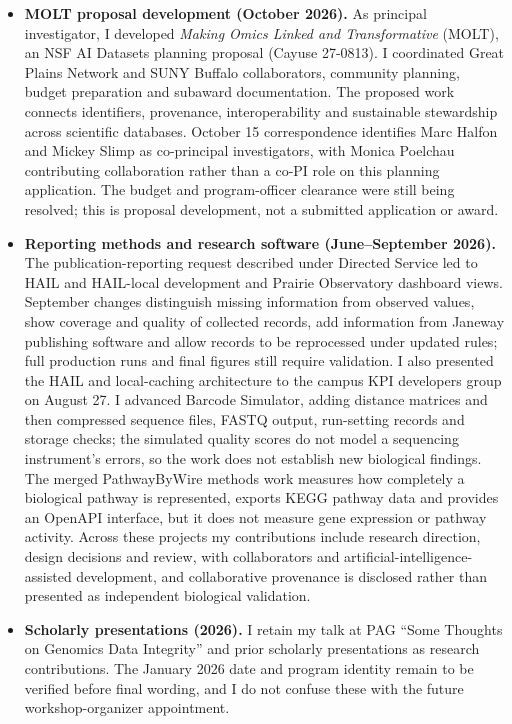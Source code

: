 \begin{itemize}
\item \textbf{MOLT proposal development (October 2026).}\label{update-molt} As principal investigator, I developed \textit{Making Omics Linked and Transformative} (MOLT), an NSF AI Datasets planning proposal (Cayuse 27-0813). I coordinated Great Plains Network and SUNY Buffalo collaborators, community planning, budget preparation and subaward documentation. The proposed work connects identifiers, provenance, interoperability and sustainable stewardship across scientific databases. October 15 correspondence identifies Marc Halfon and Mickey Slimp as co-principal investigators, with Monica Poelchau contributing collaboration rather than a co-PI role on this planning application. The budget and program-officer clearance were still being resolved; this is proposal development, not a submitted application or award.
\item \textbf{Reporting methods and research software (June--September 2026).} The publication-reporting request described under Directed Service led to HAIL and HAIL-local development and Prairie Observatory dashboard views. September changes distinguish missing information from observed values, show coverage and quality of collected records, add information from Janeway publishing software and allow records to be reprocessed under updated rules; full production runs and final figures still require validation. I also presented the HAIL and local-caching architecture to the campus KPI developers group on August 27. I advanced Barcode Simulator, adding distance matrices and then compressed sequence files, FASTQ output, run-setting records and storage checks; the simulated quality scores do not model a sequencing instrument's errors, so the work does not establish new biological findings. The merged PathwayByWire methods work measures how completely a biological pathway is represented, exports KEGG pathway data and provides an OpenAPI interface, but it does not measure gene expression or pathway activity. Across these projects my contributions include research direction, design decisions and review, with collaborators and artificial-intelligence-assisted development, and collaborative provenance is disclosed rather than presented as independent biological validation.
\item \textbf{Scholarly presentations (2026).} I retain my talk at PAG ``Some Thoughts on Genomics Data Integrity'' and prior scholarly presentations as research contributions. The January 2026 date and program identity remain to be verified before final wording, and I do not confuse these with the future workshop-organizer appointment.

\end{itemize}
